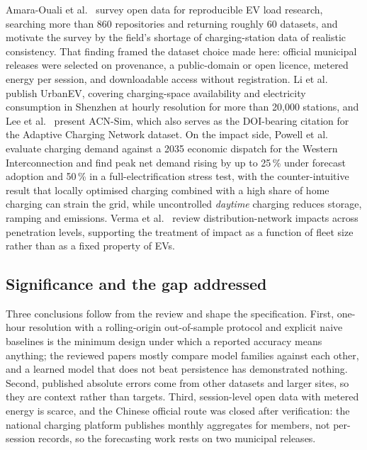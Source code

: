 \documentclass[10pt,a4paper]{article}
\begin{document}
Amara-Ouali et al.~\cite{AmaraOuali2021EVLoadOpenDataReview} survey open data for reproducible EV
load research, searching more than 860 repositories and returning roughly 60 datasets, and motivate
the survey by the field's shortage of charging-station data of realistic consistency. That finding
framed the dataset choice made here: official municipal releases were selected on provenance, a
public-domain or open licence, metered energy per session, and downloadable access without
registration. Li et al.~\cite{Li2025UrbanEV} publish UrbanEV, covering charging-space availability
and electricity consumption in Shenzhen at hourly resolution for more than 20{,}000 stations, and
Lee et al.~\cite{Lee2021ACNSim} present ACN-Sim, which also serves as the DOI-bearing citation for
the Adaptive Charging Network dataset. On the impact side, Powell et
al.~\cite{Powell2022ChargingInfrastructureGridImpacts} evaluate charging demand against a 2035
economic dispatch for the Western Interconnection and find peak net demand rising by up to
25\,\% under forecast adoption and 50\,\% in a full-electrification stress test, with the
counter-intuitive result that locally optimised charging combined with a high share of home
charging can strain the grid, while uncontrolled \emph{daytime} charging reduces storage, ramping
and emissions. Verma et al.~\cite{Verma2021ReviewImpactsDistributionNetwork} review
distribution-network impacts across penetration levels, supporting the treatment of impact as a
function of fleet size rather than as a fixed property of EVs.

\subsection{Significance and the gap addressed}

Three conclusions follow from the review and shape the specification. First, one-hour resolution
with a rolling-origin out-of-sample protocol and explicit naive baselines is the minimum design
under which a reported accuracy means anything; the reviewed papers mostly compare model families
against each other, and a learned model that does not beat persistence has demonstrated nothing.
Second, published absolute errors come from other datasets and larger sites, so they are context
rather than targets. Third, session-level open data with metered energy is scarce, and the Chinese
official route was closed after verification: the national charging platform publishes monthly
aggregates for members, not per-session records, so the forecasting work rests on two municipal
releases.
\end{document}

